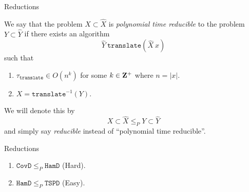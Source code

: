 \begin{frame}{Reductions}
	\begin{defn}
		We say that the problem
		\(
			X \subset \hat{X}
		\)
		is \emph{polynomial time reducible} to the problem
		\(
			Y \subset \hat{Y}
		\)
		if there exists an algorithm
		\[
			\hat{Y} \ \mathtt{translate}(\hat{X} \ x)
		\]
		such that
		\begin{enumerate}
			\item
				\(
					\tau_{\mathtt{translate}} \in O(n^k)
				\)
				for some $k \in \mathbf{Z}^+$ where $n= |x|$.
			\item
				\(
					X = \mathtt{translate}^{-1}(Y).
				\)	  
		\end{enumerate}

		We will denote this by
		\[
			X \subset \hat{X} \leq_P Y \subset \hat{Y}
		\]
		and simply say \emph{reducible} instead of ``polynomial time reducible''.
	\end{defn}
\end{frame}

%

\begin{frame}{Reductions}
	\begin{thm}
		\begin{enumerate}
			\item 
				\(
					\mathtt{CovD} \leq_P \mathtt{HamD}
				\) (Hard). \pause
			\item 
				\(
					\mathtt{HamD} \leq_P \mathtt{TSPD}
				\) (Easy).
		\end{enumerate}
	\end{thm}
\end{frame}


